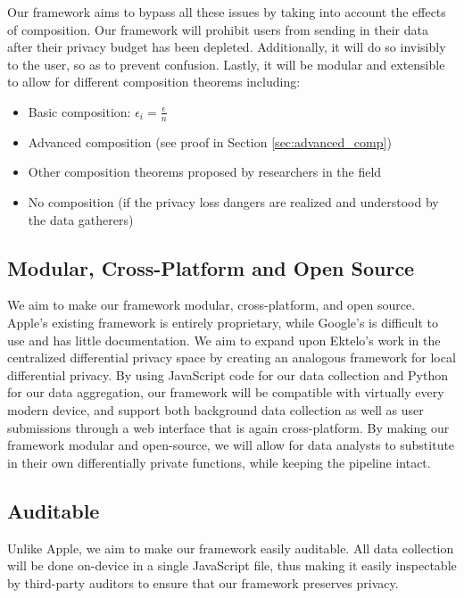 \documentclass[12pt]{article}
\theoremstyle{definition}
\begin{document}
\bigskip

Our framework aims to bypass all these issues by taking into account the effects of composition. Our framework will prohibit users from sending in their data after their privacy budget has been depleted. Additionally, it will do so invisibly to the user, so as to prevent confusion. Lastly, it will be modular and extensible to allow for different composition theorems including:

\begin{itemize}
    \item Basic composition: $\epsilon_i = \frac{\epsilon}{n}$
    \item Advanced composition (see proof in Section \ref{sec:advanced_comp})
    \item Other composition theorems proposed by researchers in the field
    \item No composition (if the privacy loss dangers are realized and understood by the data gatherers)
\end{itemize}

\subsection{Modular, Cross-Platform and Open Source}

\noindent

We aim to make our framework modular, cross-platform, and open source. Apple's existing framework is entirely proprietary, while Google's is difficult to use and has little documentation. We aim to expand upon Ektelo's work in the centralized differential privacy space by creating an analogous framework for local differential privacy. By using JavaScript code for our data collection and Python for our data aggregation, our framework will be compatible with virtually every modern device, and support both background data collection as well as user submissions through a web interface that is again cross-platform. By making our framework modular and open-source, we will allow for data analysts to substitute in their own differentially private functions, while keeping the pipeline intact.

\subsection{Auditable}

\noindent

Unlike Apple, we aim to make our framework easily auditable. All data collection will be done on-device in a single JavaScript file, thus making it easily inspectable by third-party auditors to ensure that our framework preserves privacy.
\end{document}
